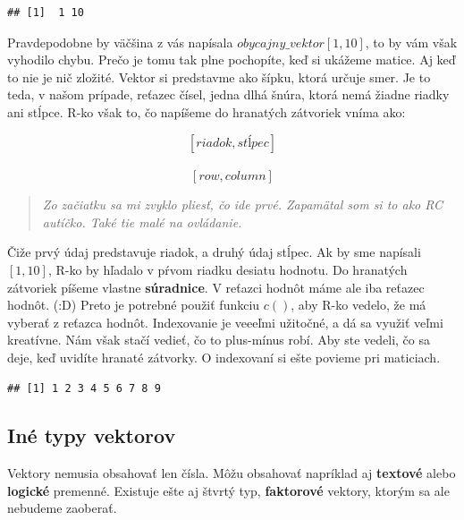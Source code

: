 \begin{verbatim}
## [1]  1 10
\end{verbatim}

Pravdepodobne by väčšina z vás napísala \(obycajny\_vektor[1, 10]\), to
by vám však vyhodilo chybu. Prečo je tomu tak plne pochopíte, keď si
ukážeme matice. Aj keď to nie je nič zložité. Vektor si predstavme ako
šípku, ktorá určuje smer. Je to teda, v našom prípade, reťazec čísel,
jedna dlhá šnúra, ktorá nemá žiadne riadky ani stĺpce. R-ko však to, čo
napíšeme do hranatých zátvoriek vníma ako:

\[[riadok, stĺpec]\]\\
\[[row, column]\]

\begin{quote}
\emph{Zo začiatku sa mi zvyklo pliesť, čo ide prvé. Zapamätal som si to
ako RC autíčko. Také tie malé na ovládanie.}
\end{quote}

Čiže prvý údaj predstavuje riadok, a druhý údaj stĺpec. Ak by sme
napísali \([1, 10]\), R-ko by hľadalo v pŕvom riadku desiatu hodnotu. Do
hranatých zátvoriek píšeme vlastne \textbf{súradnice}. V reťazci hodnôt
máme ale iba reťazec hodnôt. (:D) Preto je potrebné použiť funkciu
\(c()\), aby R-ko vedelo, že má vyberať z reťazca hodnôt. Indexovanie je
veeeľmi užitočné, a dá sa využiť veľmi kreatívne. Nám však stačí vedieť,
čo to plus-mínus robí. Aby ste vedeli, čo sa deje, keď uvidíte hranaté
zátvorky. O indexovaní si ešte povieme pri maticiach.

\begin{Shaded}
\begin{Highlighting}[]

\NormalTok{obycajny_vektor[}\OperatorTok{-}\NormalTok{]}
\end{Highlighting}
\end{Shaded}

\begin{verbatim}
## [1] 1 2 3 4 5 6 7 8 9
\end{verbatim}

\hypertarget{inuxe9-typy-vektorov}{%
\subsection{Iné typy vektorov}\label{inuxe9-typy-vektorov}}

Vektory nemusia obsahovať len čísla. Môžu obsahovať napríklad aj
\textbf{textové} alebo \textbf{logické} premenné. Existuje ešte aj
štvrtý typ, \textbf{faktorové} vektory, ktorým sa ale nebudeme zaoberať.

